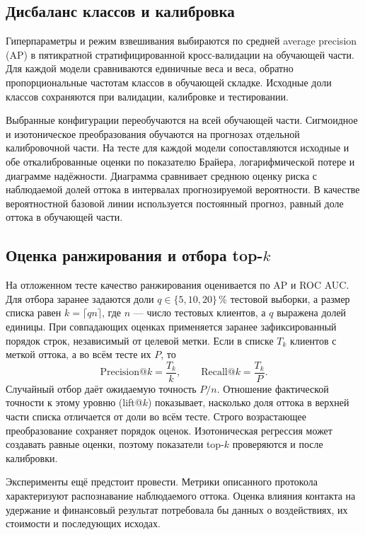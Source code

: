 \documentclass{misisarticle}
\begin{document}
\subsection{Дисбаланс классов и калибровка}

Гиперпараметры и режим взвешивания выбираются по средней average precision (AP) в пятикратной стратифицированной кросс-валидации на обучающей части. Для каждой модели сравниваются единичные веса и веса, обратно пропорциональные частотам классов в обучающей складке. Исходные доли классов сохраняются при валидации, калибровке и тестировании.

Выбранные конфигурации переобучаются на всей обучающей части. Сигмоидное и изотоническое преобразования обучаются на прогнозах отдельной калибровочной части. На тесте для каждой модели сопоставляются исходные и обе откалиброванные оценки по показателю Брайера, логарифмической потере и диаграмме надёжности. Диаграмма сравнивает среднюю оценку риска с наблюдаемой долей оттока в интервалах прогнозируемой вероятности. В качестве вероятностной базовой линии используется постоянный прогноз, равный доле оттока в обучающей части.

\subsection{Оценка ранжирования и отбора top-$k$}

На отложенном тесте качество ранжирования оценивается по AP и ROC AUC. Для отбора заранее задаются доли $q\in\{5,10,20\}\,\%$ тестовой выборки, а размер списка равен $k=\lceil qn\rceil$, где $n$ — число тестовых клиентов, а $q$ выражена долей единицы. При совпадающих оценках применяется заранее зафиксированный порядок строк, независимый от целевой метки. Если в списке $T_k$ клиентов с меткой оттока, а во всём тесте их $P$, то
\[
  \mathrm{Precision@}k=\frac{T_k}{k},
  \qquad \mathrm{Recall@}k=\frac{T_k}{P}.
\]
Случайный отбор даёт ожидаемую точность $P/n$. Отношение фактической точности к этому уровню (lift@$k$) показывает, насколько доля оттока в верхней части списка отличается от доли во всём тесте. Строго возрастающее преобразование сохраняет порядок оценок. Изотоническая регрессия может создавать равные оценки, поэтому показатели top-$k$ проверяются и после калибровки.

Эксперименты ещё предстоит провести. Метрики описанного протокола характеризуют распознавание наблюдаемого оттока. Оценка влияния контакта на удержание и финансовый результат потребовала бы данных о воздействиях, их стоимости и последующих исходах.
\end{document}
